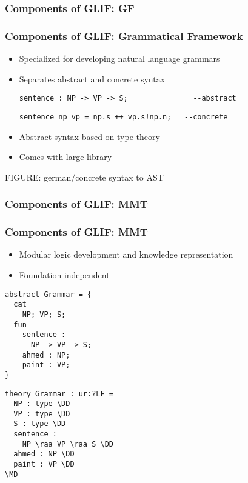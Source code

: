 \begin{frame}
    \frametitle{Components of GLIF: GF}
    
\end{frame}

\begin{frame}[fragile]
    \frametitle{Components of GLIF: Grammatical Framework \cite{GF:on}}
    \begin{itemize}
        \item Specialized for developing natural language grammars
        \item Separates abstract and concrete syntax\par
            \quad\lstinline[language=GF]|sentence : NP -> VP -> S;               --abstract|\par
            \quad\lstinline[language=GF]|sentence np vp = np.s ++ vp.s!np.n;   --concrete|
        \item Abstract syntax based on type theory
        \item Comes with large library 
    \end{itemize}

    FIGURE: german/concrete syntax to AST
\end{frame}

\begin{frame}
    \frametitle{Components of GLIF: MMT}
    
\end{frame}

\begin{frame}[fragile]
    \frametitle{Components of GLIF: MMT}
    \begin{itemize}   
        \item Modular logic development and knowledge representation
        \item Foundation-independent
    \end{itemize}
    
    \lstset{basicstyle=\footnotesize\ttfamily}
    \begin{minipage}[t]{0.4\textwidth}
        \begin{lstlisting}[language=GF]
abstract Grammar = {
  cat
    NP; VP; S;
  fun
    sentence :
      NP -> VP -> S;
    ahmed : NP;
    paint : VP;
}
        \end{lstlisting}
    \end{minipage}
    \begin{minipage}[t]{0.4\textwidth}
        \begin{lstlisting}[language=MMT]
theory Grammar : ur:?LF =
  NP : type \DD
  VP : type \DD
  S : type \DD
  sentence :
    NP \raa VP \raa S \DD
  ahmed : NP \DD
  paint : VP \DD
\MD
        \end{lstlisting}
    \end{minipage}
\end{frame}
